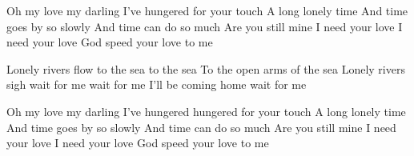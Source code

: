 \resetVars%
%
%
\makeheader%
\lyrics%
Oh my love my darling
I've hungered for your touch
A long lonely time
And time goes by so slowly
And time can do so much
Are you still mine
I need your love
I need your love
God speed your love to me

Lonely rivers flow to the sea to the sea
To the open arms of the sea
Lonely rivers sigh wait for me wait for me
I'll be coming home wait for me

Oh my love my darling
I've hungered hungered for your touch
A long lonely time
And time goes by so slowly
And time can do so much
Are you still mine I need your love
I need your love
God speed your love to me
\next
